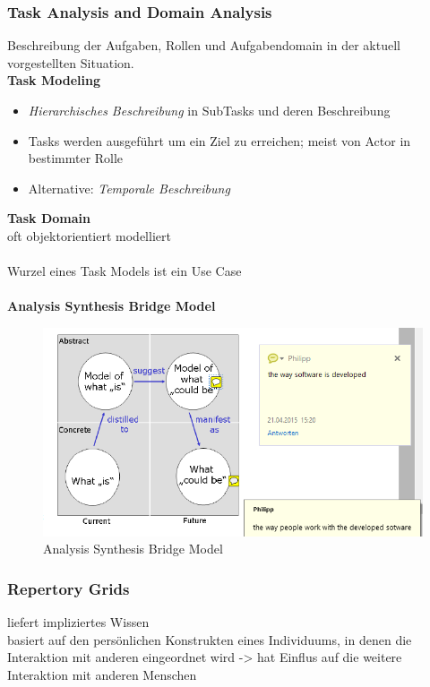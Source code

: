 \subsubsection{Task Analysis and Domain Analysis}
Beschreibung der Aufgaben, Rollen und Aufgabendomain in der aktuell vorgestellten Situation.\\
\textbf{Task Modeling}
\begin{itemize}
	\item \textit{Hierarchisches Beschreibung} in  SubTasks und deren Beschreibung
	\item Tasks werden ausgeführt um ein Ziel zu erreichen; meist von Actor in bestimmter Rolle
	\item Alternative: \textit{Temporale Beschreibung} 
\end{itemize}
\textbf{Task Domain}\\
oft objektorientiert modelliert\\
\\
Wurzel eines Task Models ist ein Use Case\\
\\
\textbf{Analysis Synthesis Bridge Model}
\begin{figure}[!h]
	\centering
	\includegraphics[scale=0.6]{img/analysis_synthesis_bridge_model.png}
	\caption{Analysis Synthesis Bridge Model}
\end{figure}

\subsubsection{Repertory Grids}
liefert impliziertes Wissen\\
basiert auf den persönlichen Konstrukten eines Individuums, in denen die Interaktion mit anderen eingeordnet wird -> hat Einflus auf die weitere Interaktion mit anderen Menschen